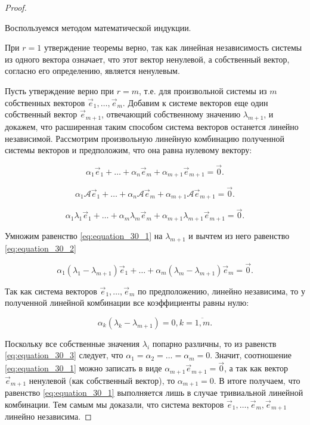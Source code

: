 \begin{proof}~

    Воспользуемся методом математической индукции.

    При $r = 1$ утверждение теоремы верно, так как линейная независимость системы из одного вектора означает, что этот вектор ненулевой, а собственный вектор, согласно его определению, является ненулевым.

    Пусть утверждение верно при $r = m$, т.е. для произвольной системы из $m$ собственных векторов $\vec{e}_1, \ldots, \vec{e}_m$. Добавим к системе векторов еще один собственный вектор $\vec{e}_{m + 1}$, отвечающий собственному значению $\lambda_{m + 1}$, и докажем, что расширенная таким способом система векторов останется линейно независимой. Рассмотрим произвольную линейную комбинацию полученной системы векторов и предположим, что она равна нулевому вектору:

    \begin{equation}
        \alpha_1\vec{e}_1 + \ldots + \alpha_n\vec{e}_m + \alpha_{m + 1}\vec{e}_{m + 1} = \vec{0}.
        \label{eq:equation_30_1}
    \end{equation}

    $$\alpha_1\mathscr{A}\vec{e}_1 + \ldots + \alpha_n\mathscr{A}\vec{e}_m + \alpha_{m + 1}\mathscr{A}\vec{e}_{m + 1} = \vec{0}.$$

    \begin{equation}
        \alpha_1\lambda_1\vec{e}_1 + \ldots + \alpha_m\lambda_m\vec{e}_m + \alpha_{m + 1}\lambda_{m + 1}\vec{e}_{m + 1} = \vec{0}.
        \label{eq:equation_30_2}
    \end{equation}

    Умножим равенство \eqref{eq:equation_30_1} на $\lambda_{m + 1}$ и вычтем из него равенство \eqref{eq:equation_30_2}

    $$\alpha_1(\lambda_1 - \lambda_{m + 1})\vec{e}_1 + \ldots + \alpha_m(\lambda_m - \lambda_{m + 1})\vec{e}_m = \vec{0}.$$

    Так как система векторов $\vec{e}_1, \ldots, \vec{e}_m$ по предположению, линейно независима, то у полученной линейной комбинации все коэффициенты равны нулю:

    \begin{equation}
        \alpha_k(\lambda_k - \lambda_{m + 1}) = 0, k = \overline{1, m}.
        \label{eq:equation_30_3}
    \end{equation}

    Поскольку все собственные значения $\lambda_i$ попарно различны, то из равенств \eqref{eq:equation_30_3} следует, что $\alpha_1 = \alpha_2 = \ldots = \alpha_m = 0$. Значит, соотношение \eqref{eq:equation_30_1} можно записать в виде $\alpha_{m + 1}\vec{e}_{m + 1} = \vec{0}$, а так как вектор $\vec{e}_{m + 1}$ ненулевой (как собственный вектор), то $\alpha_{m + 1} = 0$. В итоге получаем, что равенство \eqref{eq:equation_30_1} выполняется лишь в случае тривиальной линейной комбинации. Тем самым мы доказали, что система векторов $\vec{e}_1, \ldots, \vec{e}_m, \vec{e}_{m + 1}$ линейно независима.
\end{proof}